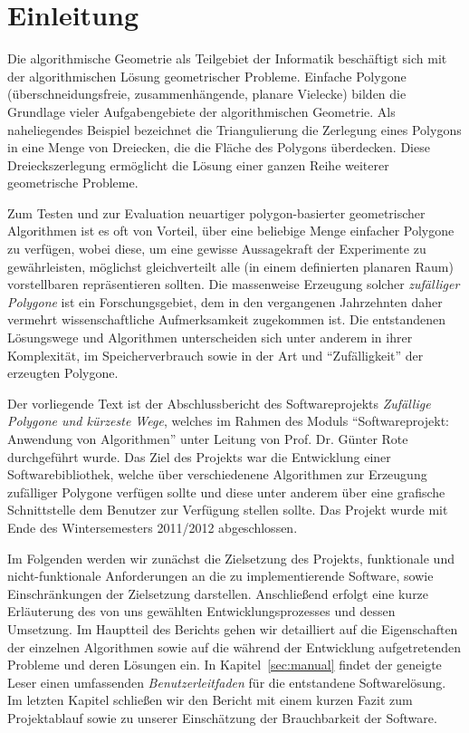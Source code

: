 \section{Einleitung}
Die algorithmische Geometrie als Teilgebiet der Informatik beschäftigt sich mit der algorithmischen Lösung geometrischer Probleme. Einfache Polygone (überschneidungsfreie, zusammenhängende, planare Vielecke) bilden die Grundlage vieler Aufgabengebiete der algorithmischen Geometrie. Als naheliegendes Beispiel bezeichnet die Triangulierung die Zerlegung eines Polygons in eine Menge von Dreiecken, die die Fläche des Polygons überdecken. Diese Dreieckszerlegung ermöglicht die Lösung einer ganzen Reihe weiterer geometrische Probleme.

Zum Testen und zur Evaluation neuartiger polygon-basierter geometrischer Algorithmen ist es oft von Vorteil, über eine beliebige Menge einfacher Polygone zu verfügen, wobei diese, um eine gewisse Aussagekraft der Experimente zu gewährleisten, möglichst gleichverteilt alle (in einem definierten planaren Raum) vorstellbaren repräsentieren sollten. Die massenweise Erzeugung solcher \emph{zufälliger Polygone} ist ein Forschungsgebiet, dem in den vergangenen Jahrzehnten daher vermehrt wissenschaftliche Aufmerksamkeit zugekommen ist. Die entstandenen Lösungswege und Algorithmen unterscheiden sich unter anderem in ihrer Komplexität, im Speicherverbrauch sowie in der Art und \enquote{Zufälligkeit} der erzeugten Polygone.

Der vorliegende Text ist der Abschlussbericht des Softwareprojekts \emph{Zufällige Polygone und kürzeste Wege}, welches im Rahmen des Moduls \enquote{Softwareprojekt: Anwendung von Algorithmen} unter Leitung von Prof. Dr. Günter Rote durchgeführt wurde. Das Ziel des Projekts war die Entwicklung einer Softwarebibliothek, welche über verschiedenene Algorithmen zur Erzeugung zufälliger Polygone verfügen sollte und diese unter anderem über eine grafische Schnittstelle dem Benutzer zur Verfügung stellen sollte. Das Projekt wurde mit Ende des Wintersemesters 2011/2012 abgeschlossen.

Im Folgenden werden wir zunächst die Zielsetzung des Projekts, funktionale und nicht-funktionale Anforderungen an die zu implementierende Software, sowie Einschränkungen der Zielsetzung darstellen. Anschließend erfolgt eine kurze Erläuterung des von uns gewählten Entwicklungsprozesses und dessen Umsetzung. Im Hauptteil des Berichts gehen wir detailliert auf die Eigenschaften der einzelnen Algorithmen sowie auf die während der Entwicklung aufgetretenden Probleme und deren Lösungen ein. In Kapitel~\ref{sec:manual} findet der geneigte Leser einen umfassenden \emph{Benutzerleitfaden} für die entstandene Softwarelösung. Im letzten Kapitel schließen wir den Bericht mit einem kurzen Fazit zum Projektablauf sowie zu unserer Einschätzung der Brauchbarkeit der Software.
